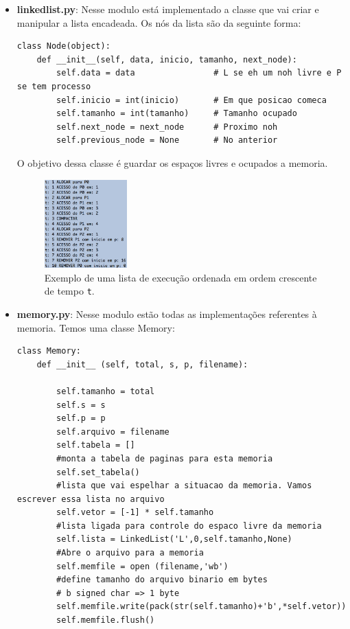 \documentclass[12pt,a4paper]{article}
\begin{document}
\begin{itemize}
\item \textbf{linkedlist.py}: Nesse modulo está implementado a classe que vai criar e manipular a lista encadeada. Os nós da lista são da seguinte forma:
\begin{lstlisting}
class Node(object):
    def __init__(self, data, inicio, tamanho, next_node):
        self.data = data                # L se eh um noh livre e P se tem processo
        self.inicio = int(inicio)       # Em que posicao comeca
        self.tamanho = int(tamanho)     # Tamanho ocupado
        self.next_node = next_node      # Proximo noh
        self.previous_node = None       # No anterior
\end{lstlisting}
O objetivo dessa classe é guardar os espaços livres e ocupados a memoria. 

\begin{figure}[htpb]
\centering
\includegraphics[width=0.3\textwidth]{fig/lista_execucao.png}
\caption{Exemplo de uma lista de execução ordenada em ordem crescente de tempo \texttt{t}.}
\label{fig:execucao}
\end{figure}

\item \textbf{memory.py}: Nesse modulo estão todas as implementações referentes à memoria. Temos uma classe Memory:
\begin{lstlisting}
class Memory:
    def __init__ (self, total, s, p, filename):
    
        self.tamanho = total
        self.s = s
        self.p = p
        self.arquivo = filename
        self.tabela = []
        #monta a tabela de paginas para esta memoria
        self.set_tabela()
        #lista que vai espelhar a situacao da memoria. Vamos escrever essa lista no arquivo
        self.vetor = [-1] * self.tamanho 
        #lista ligada para controle do espaco livre da memoria
        self.lista = LinkedList('L',0,self.tamanho,None)
        #Abre o arquivo para a memoria
        self.memfile = open (filename,'wb')
        #define tamanho do arquivo binario em bytes
        # b signed char => 1 byte
        self.memfile.write(pack(str(self.tamanho)+'b',*self.vetor))
        self.memfile.flush()
\end{lstlisting}


\end{itemize}
\end{document}

